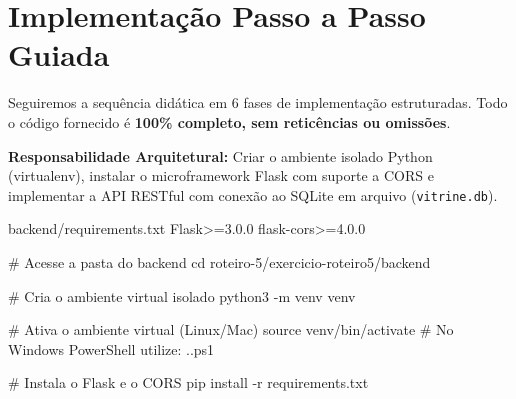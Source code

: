
\section{Implementação Passo a Passo Guiada}\label{sec:m2a}\label{sec:m3a}

Seguiremos a sequência didática em 6 fases de implementação estruturadas. Todo o código fornecido é \textbf{100\% completo, sem reticências ou omissões}.

\begin{boxAtividade}
\textbf{Responsabilidade Arquitetural:} Criar o ambiente isolado Python (virtualenv), instalar o microframework Flask com suporte a CORS e implementar a API RESTful com conexão ao SQLite em arquivo (\texttt{vitrine.db}).
\end{boxAtividade}

\begin{codigo}[txt]{backend/requirements.txt}
Flask>=3.0.0
flask-cors>=4.0.0
\end{codigo}

\begin{saida}[Terminal]
# Acesse a pasta do backend
cd roteiro-5/exercicio-roteiro5/backend

# Cria o ambiente virtual isolado
python3 -m venv venv

# Ativa o ambiente virtual (Linux/Mac)
source venv/bin/activate
# No Windows PowerShell utilize: .\venv\Scripts\Activate.ps1

# Instala o Flask e o CORS
pip install -r requirements.txt
\end{saida}

